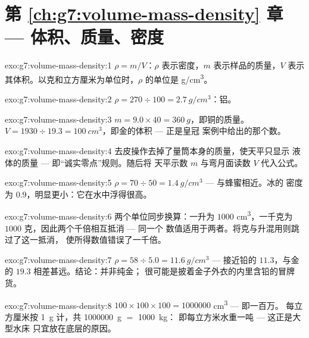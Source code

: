 \section*{第 \ref{ch:g7:volume-mass-density} 章 --- 体积、质量、密度}

\begin{solution}{exo:g7:volume-mass-density:1}
$\rho = m/V$：$\rho$ 表示密度，$m$ 表示样品的质量，$V$ 表示
其体积。以克和立方厘米为单位时，$\rho$ 的单位是
\unit{g/cm^3}。
\end{solution}

\begin{solution}{exo:g7:volume-mass-density:2}
$\rho = 270 \div 100 = \qty{2.7}{g/cm^3}$：铝。
\end{solution}

\begin{solution}{exo:g7:volume-mass-density:3}
$m = 9.0 \times 40 = \qty{360}{g}$，即铜的质量。
$V = 1930 \div 19.3 = \qty{100}{cm^3}$，即金的体积 --- 正是皇冠
案例中给出的那个数。
\end{solution}

\begin{solution}{exo:g7:volume-mass-density:4}
去皮操作去掉了量筒本身的质量，使天平只显示
液体的质量 --- 即“诚实零点”规则。随后将
天平示数 $m$ 与弯月面读数 $V$ 代入公式。
\end{solution}

\begin{solution}{exo:g7:volume-mass-density:5}
$\rho = 70 \div 50 = \qty{1.4}{g/cm^3}$ --- 与蜂蜜相近。冰的
密度为 $0.9$，明显更小：它在水中浮得很高。
\end{solution}

\begin{solution}{exo:g7:volume-mass-density:6}
两个单位同步换算：一升为 $1000$ \unit{cm^3}，一千克为
$1000$ 克，因此两个千倍相互抵消 --- 同一个
数值适用于两者。将克与升混用则跳过了这一抵消，
使所得数值错误了一千倍。
\end{solution}

\begin{solution}{exo:g7:volume-mass-density:7}
$\rho = 58 \div 5.0 = \qty{11.6}{g/cm^3}$ --- 接近铅的
$11.3$，与金的 $19.3$ 相差甚远。结论：并非纯金；
很可能是披着金子外衣的内里含铅的冒牌货。
\end{solution}

\begin{solution}{exo:g7:volume-mass-density:8}
$100 \times 100 \times 100 = 1000000$ \unit{cm^3} --- 即一百万。
每立方厘米按 \qty{1}{g} 计，共 \qty{1000000}{g} $=$ \qty{1000}{kg}：
即每立方米水重一吨 --- 这正是大型水床
只宜放在底层的原因。
\end{solution}

